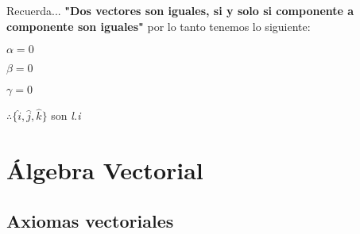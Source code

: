 \documentclass[12pt,openany]{book}
\begin{document}
	   \noindent Recuerda... \textbf{"Dos vectores son iguales, si y solo si componente a componente son iguales"} 
       por lo tanto tenemos lo siguiente:

       \begin{multicols}{3}
       $ \alpha = 0 $
       \columnbreak
       
       $ \beta = 0  $
       \columnbreak
       
       $ \gamma = 0 $
       \end{multicols}

       $ \therefore \lbrace\hat{i}, \hat{j}, \hat{k} \rbrace $ son \textsl{l.i}

	\section{\'Algebra Vectorial}   

	    \subsection{Axiomas vectoriales}
\end{document}
